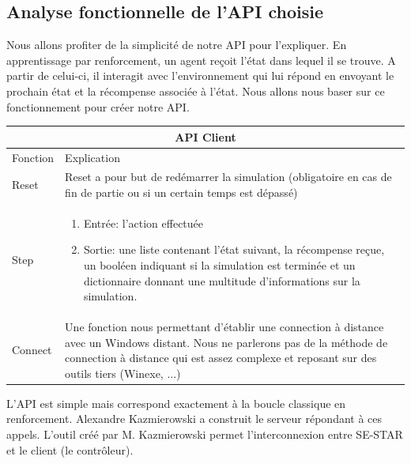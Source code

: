 \subsection{Analyse fonctionnelle de l'\gls{API} choisie}

Nous allons profiter de la simplicité de notre API pour l'expliquer. En apprentissage par renforcement,  un agent reçoit l'état dans lequel il se trouve. A partir de celui-ci, il interagit avec l'environnement qui lui répond en envoyant le prochain état et la récompense associée à l'état. Nous allons nous baser sur ce fonctionnement pour créer notre \gls{API}. 


\bigskip


\setlength{\arrayrulewidth}{.7mm}
\setlength{\tabcolsep}{12pt}
\renewcommand{\arraystretch}{2.}

\begin{center}
{
\begin{tabular}{ |p{2cm}|p{8cm}|  }
\hline
\multicolumn{2}{|c|}{\gls{API} Client} \\
\hline
Fonction & Explication \\
\hline
Reset & Reset a pour but de redémarrer la simulation (obligatoire en cas de fin de partie ou si un certain temps est dépassé) \\
\hline
Step & \begin{enumerate}
\item Entrée: l'action effectuée
\item Sortie: une liste contenant l'état suivant, la récompense reçue, un booléen indiquant si la simulation est terminée et un dictionnaire donnant une multitude d'informations sur la simulation.
\end{enumerate} \\
\hline
Connect & Une fonction nous permettant d'établir une connection à distance avec un Windows distant. Nous ne parlerons pas de la méthode de connection à distance qui est assez complexe et reposant sur des outils tiers (Winexe, ...) \\
\hline
\end{tabular}
}
\end{center}



L'\gls{API} est simple mais correspond exactement à la boucle classique en renforcement. Alexandre Kazmierowski a construit le serveur répondant à ces appels. L'outil créé par M. Kazmierowski permet l'interconnexion entre SE-STAR et le client (le contrôleur).

